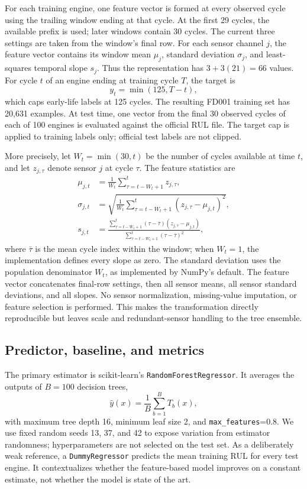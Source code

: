 ﻿\documentclass[conference]{IEEEtran}
\begin{document}
For each training engine, one feature vector is formed at every observed cycle using the trailing window ending at that cycle. At the first 29 cycles, the available prefix is used; later windows contain 30 cycles. The current three settings are taken from the window's final row. For each sensor channel $j$, the feature vector contains its window mean $\mu_j$, standard deviation $\sigma_j$, and least-squares temporal slope $s_j$. Thus the representation has $3+3(21)=66$ values. For cycle $t$ of an engine ending at training cycle $T$, the target is
\begin{equation}
 y_t = \min(125, T-t),
\end{equation}
which caps early-life labels at 125 cycles. The resulting FD001 training set has 20,631 examples. At test time, one vector from the final 30 observed cycles of each of 100 engines is evaluated against the official RUL file. The target cap is applied to training labels only; official test labels are not clipped.

More precisely, let $W_t=\min(30,t)$ be the number of cycles available at time $t$, and let $z_{j,\tau}$ denote sensor $j$ at cycle $\tau$. The feature statistics are
\begin{align}
 \mu_{j,t} &= \frac{1}{W_t}\sum_{\tau=t-W_t+1}^{t}z_{j,\tau},\\
 \sigma_{j,t} &= \sqrt{\frac{1}{W_t}\sum_{\tau=t-W_t+1}^{t}(z_{j,\tau}-\mu_{j,t})^2},\\
 s_{j,t} &= \frac{\sum_{\tau=t-W_t+1}^{t}( \tau-\bar{\tau})(z_{j,\tau}-\mu_{j,t})}
 {\sum_{\tau=t-W_t+1}^{t}(\tau-\bar{\tau})^2},
\end{align}
where $\bar{\tau}$ is the mean cycle index within the window; when $W_t=1$, the implementation defines every slope as zero. The standard deviation uses the population denominator $W_t$, as implemented by NumPy's default. The feature vector concatenates final-row settings, then all sensor means, all sensor standard deviations, and all slopes. No sensor normalization, missing-value imputation, or feature selection is performed. This makes the transformation directly reproducible but leaves scale and redundant-sensor handling to the tree ensemble.

\subsection{Predictor, baseline, and metrics}
The primary estimator is scikit-learn's \texttt{RandomForestRegressor}. It averages the outputs of $B=100$ decision trees,
\begin{equation}
 \hat{y}(x)=\frac{1}{B}\sum_{b=1}^{B}T_b(x),
\end{equation}
with maximum tree depth 16, minimum leaf size 2, and \texttt{max\_features}=0.8. We use fixed random seeds 13, 37, and 42 to expose variation from estimator randomness; hyperparameters are not selected on the test set. As a deliberately weak reference, a \texttt{DummyRegressor} predicts the mean training RUL for every test engine. It contextualizes whether the feature-based model improves on a constant estimate, not whether the model is state of the art.
\end{document}
